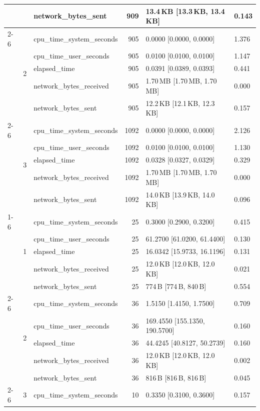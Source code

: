\begin{tabular}{lllrll}
 &  & network_bytes_sent & 909 & 13.4\,KB [13.3\,KB, 13.4\,KB] & 0.143 \\
\cline{2-6}
 & \multirow[t]{5}{*}{2} & cpu_time_system_seconds & 905 & 0.0000 [0.0000, 0.0000] & 1.376 \\
 &  & cpu_time_user_seconds & 905 & 0.0100 [0.0100, 0.0100] & 1.147 \\
 &  & elapsed_time & 905 & 0.0391 [0.0389, 0.0393] & 0.441 \\
 &  & network_bytes_received & 905 & 1.70\,MB [1.70\,MB, 1.70\,MB] & 0.000 \\
 &  & network_bytes_sent & 905 & 12.2\,KB [12.1\,KB, 12.3\,KB] & 0.157 \\
\cline{2-6}
 & \multirow[t]{5}{*}{3} & cpu_time_system_seconds & 1092 & 0.0000 [0.0000, 0.0000] & 2.126 \\
 &  & cpu_time_user_seconds & 1092 & 0.0100 [0.0100, 0.0100] & 1.130 \\
 &  & elapsed_time & 1092 & 0.0328 [0.0327, 0.0329] & 0.329 \\
 &  & network_bytes_received & 1092 & 1.70\,MB [1.70\,MB, 1.70\,MB] & 0.000 \\
 &  & network_bytes_sent & 1092 & 14.0\,KB [13.9\,KB, 14.0\,KB] & 0.096 \\
\cline{1-6} \cline{2-6}
\multirow[t]{15}{*}{knn-search-duckdb-large} & \multirow[t]{5}{*}{1} & cpu_time_system_seconds & 25 & 0.3000 [0.2900, 0.3200] & 0.415 \\
 &  & cpu_time_user_seconds & 25 & 61.2700 [61.0200, 61.4400] & 0.130 \\
 &  & elapsed_time & 25 & 16.0342 [15.9733, 16.1196] & 0.131 \\
 &  & network_bytes_received & 25 & 12.0\,KB [12.0\,KB, 12.0\,KB] & 0.021 \\
 &  & network_bytes_sent & 25 & 774\,B [774\,B, 840\,B] & 0.554 \\
\cline{2-6}
 & \multirow[t]{5}{*}{2} & cpu_time_system_seconds & 36 & 1.5150 [1.4150, 1.7500] & 0.709 \\
 &  & cpu_time_user_seconds & 36 & 169.4550 [155.1350, 190.5700] & 0.160 \\
 &  & elapsed_time & 36 & 44.4245 [40.8127, 50.2739] & 0.160 \\
 &  & network_bytes_received & 36 & 12.0\,KB [12.0\,KB, 12.0\,KB] & 0.002 \\
 &  & network_bytes_sent & 36 & 816\,B [816\,B, 816\,B] & 0.045 \\
\cline{2-6}
 & \multirow[t]{5}{*}{3} & cpu_time_system_seconds & 10 & 0.3350 [0.3100, 0.3600] & 0.157 \\

\end{tabular}
